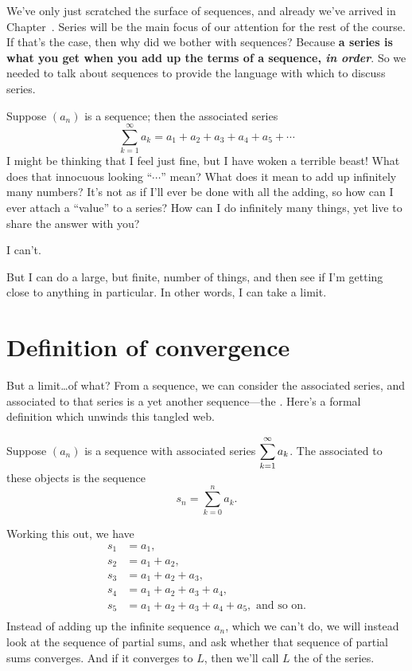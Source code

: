 
\nobreak We've only just scratched the surface of sequences, and
already we've arrived in Chapter~.  Series will
be the main focus of our attention for the rest of the course.  If
that's the case, then why did we bother with sequences?  Because
\textbf{a series is what you get when you add up the terms of a
  sequence, \textit{in order}}.  So we needed to talk about sequences
to provide the language with which to discuss series.

Suppose $(a_n)$ is a sequence; then the associated series
$$\sum_{k=1}^\infty a_k=a_1+a_2+a_3+a_4+a_5+\cdots$$
I might be thinking that I feel just fine, but I have woken a terrible
beast!  What does that innocuous looking ``$\cdots$'' mean?  What does
it mean to add up infinitely many numbers?  It's not as if I'll ever
be done with all the adding, so how can I ever attach a ``value'' to a
series?  How can I do infinitely many things, yet live to share the
answer with you?

I can't.

But I can do a large, but finite, number of things, and then see if
I'm getting close to anything in particular.  In other words, I can
take a limit.

\section{Definition of convergence}
\label{section:series-definition}

But a limit\ldots of what?  From a sequence, we can consider the
associated series, and associated to that series is a yet another
sequence---the .  Here's a formal definition which unwinds this tangled web.
\begin{definition}
  Suppose $(a_n)$ is a sequence with associated series
  $\displaystyle\sum_{k=1}^\infty a_k$.  The 
  associated to these objects is the sequence
 $$
 s_n = \sum_{k=0}^n a_k.
 $$
 \end{definition}
Working this out, we have
\begin{align*}
  s_1&=a_1, \\
  s_2&=a_1+a_2,\\ 
  s_3&=a_1+a_2+a_3, \\
  s_4&=a_1+a_2+a_3+a_4, \\
  s_5&=a_1+a_2+a_3+a_4+a_5, \mbox{ and so on.}\\
\end{align*}
Instead of adding up the infinite sequence $a_n$, which we can't do,
we will instead look at the sequence of partial sums, and ask whether
that sequence of partial sums converges.  And if it converges to $L$,
then we'll call $L$ the  of the series.

